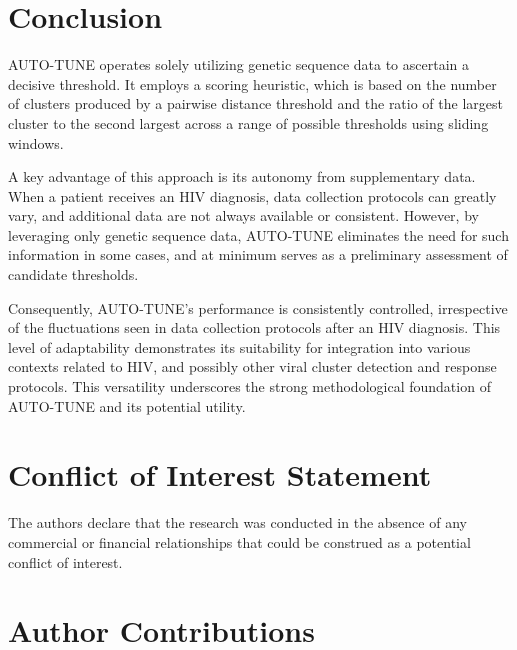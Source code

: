\documentclass[utf8]{FrontiersinHarvard} %
\newcommand{\TODO}[1]{{\color{red}{#1}}}
\begin{document}
\section{Conclusion}

AUTO-TUNE operates solely utilizing genetic sequence data to ascertain a
decisive threshold. It employs a scoring heuristic, which is based on the
number of clusters produced by a pairwise distance threshold and the ratio of
the largest cluster to the second largest across a range of possible thresholds
using sliding windows.

A key advantage of this approach is its autonomy from supplementary data. When
a patient receives an HIV diagnosis, data collection protocols can greatly vary,
and additional data are not always available or consistent. However, by
leveraging only genetic sequence data, AUTO-TUNE eliminates the need for such
information in some cases, and at minimum serves as a preliminary assessment of
candidate thresholds.

Consequently, AUTO-TUNE's performance is consistently controlled, irrespective
of the fluctuations seen in data collection protocols after an HIV
diagnosis. This level of adaptability demonstrates its suitability for
integration into various contexts related to HIV, and possibly other viral
cluster detection and response protocols. This versatility underscores the
strong methodological foundation of AUTO-TUNE and its potential utility.

\TODO{SAR -- Can we provide proof that Auto-Tune is useful for other viruses as
	well as HIV? There should be at least some databases of HCV, influenza and
	SARS-CoV-2 available to test this.}

\section*{Conflict of Interest Statement}

The authors declare that the research was conducted in the absence of any
commercial or financial relationships that could be construed as a potential
conflict of interest.

\section*{Author Contributions}
\end{document}

